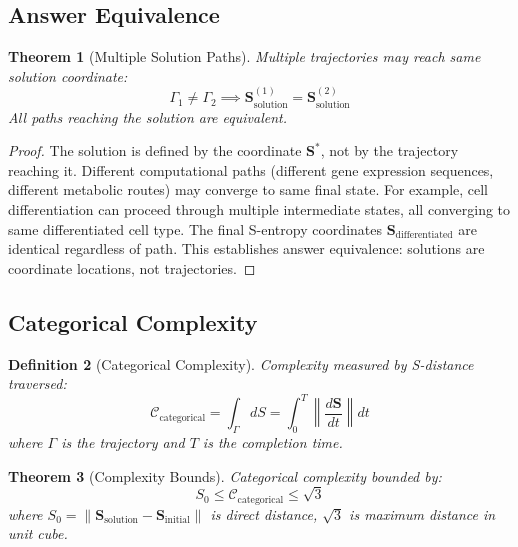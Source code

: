 \documentclass[11pt,a4paper]{article}
\newtheorem{theorem}{Theorem}[section]
\newtheorem{definition}[theorem]{Definition}
\theoremstyle{remark}
\newcommand{\Scoord}{\mathbf{S}}
\begin{document}
\subsection{Answer Equivalence}

\begin{theorem}[Multiple Solution Paths]
\label{thm:answer_equivalence}
Multiple trajectories may reach same solution coordinate:
\begin{equation}
\Gamma_1 \neq \Gamma_2 \implies \Scoord_{\text{solution}}^{(1)} = \Scoord_{\text{solution}}^{(2)}
\end{equation}
All paths reaching the solution are equivalent.
\end{theorem}

\begin{proof}
The solution is defined by the coordinate $\Scoord^*$, not by the trajectory reaching it. Different computational paths (different gene expression sequences, different metabolic routes) may converge to same final state. For example, cell differentiation can proceed through multiple intermediate states, all converging to same differentiated cell type. The final S-entropy coordinates $\Scoord_{\text{differentiated}}$ are identical regardless of path. This establishes answer equivalence: solutions are coordinate locations, not trajectories.
\end{proof}

\subsection{Categorical Complexity}

\begin{definition}[Categorical Complexity]
\label{def:categorical_complexity}
Complexity measured by S-distance traversed:
\begin{equation}
\mathcal{C}_{\text{categorical}} = \int_{\Gamma} dS = \int_0^T \left\|\frac{d\Scoord}{dt}\right\| dt
\end{equation}
where $\Gamma$ is the trajectory and $T$ is the completion time.
\end{definition}

\begin{theorem}[Complexity Bounds]
\label{thm:complexity_bounds}
Categorical complexity bounded by:
\begin{equation}
S_0 \leq \mathcal{C}_{\text{categorical}} \leq \sqrt{3}
\end{equation}
where $S_0 = \|\Scoord_{\text{solution}} - \Scoord_{\text{initial}}\|$ is direct distance, $\sqrt{3}$ is maximum distance in unit cube.
\end{theorem}
\end{document}
